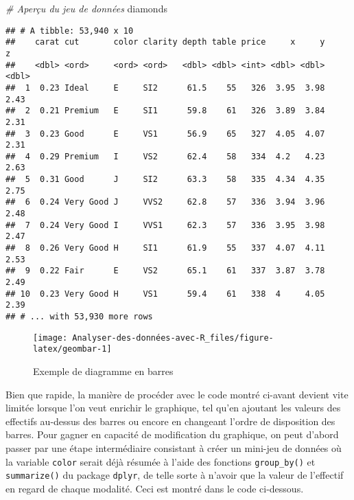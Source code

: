 \documentclass[
  french,
]{book}
\newenvironment{Shaded}{\begin{snugshade}}{\end{snugshade}}
\newcommand{\CommentTok}[1]{\textcolor[rgb]{0.56,0.35,0.01}{\textit{#1}}}
\newcommand{\DataTypeTok}[1]{\textcolor[rgb]{0.13,0.29,0.53}{#1}}
\newcommand{\KeywordTok}[1]{\textcolor[rgb]{0.13,0.29,0.53}{\textbf{#1}}}
\newcommand{\NormalTok}[1]{#1}
\newcommand{\OperatorTok}[1]{\textcolor[rgb]{0.81,0.36,0.00}{\textbf{#1}}}
\newcommand{\StringTok}[1]{\textcolor[rgb]{0.31,0.60,0.02}{#1}}
\begin{document}
\begin{Shaded}
\begin{Highlighting}[]
\CommentTok{# Aperçu du jeu de données}
\NormalTok{diamonds}
\end{Highlighting}
\end{Shaded}

\begin{verbatim}
## # A tibble: 53,940 x 10
##    carat cut       color clarity depth table price     x     y     z
##    <dbl> <ord>     <ord> <ord>   <dbl> <dbl> <int> <dbl> <dbl> <dbl>
##  1  0.23 Ideal     E     SI2      61.5    55   326  3.95  3.98  2.43
##  2  0.21 Premium   E     SI1      59.8    61   326  3.89  3.84  2.31
##  3  0.23 Good      E     VS1      56.9    65   327  4.05  4.07  2.31
##  4  0.29 Premium   I     VS2      62.4    58   334  4.2   4.23  2.63
##  5  0.31 Good      J     SI2      63.3    58   335  4.34  4.35  2.75
##  6  0.24 Very Good J     VVS2     62.8    57   336  3.94  3.96  2.48
##  7  0.24 Very Good I     VVS1     62.3    57   336  3.95  3.98  2.47
##  8  0.26 Very Good H     SI1      61.9    55   337  4.07  4.11  2.53
##  9  0.22 Fair      E     VS2      65.1    61   337  3.87  3.78  2.49
## 10  0.23 Very Good H     VS1      59.4    61   338  4     4.05  2.39
## # ... with 53,930 more rows
\end{verbatim}

\begin{Shaded}
\end{Shaded}

\begin{figure}

{\centering \texttt{[image: Analyser-des-données-avec-R\_files/figure-latex/geombar-1]} 

}

\caption{Exemple de diagramme en barres}\label{fig:geombar}
\end{figure}

Bien que rapide, la manière de procéder avec le code montré ci-avant devient vite limitée lorsque l'on veut enrichir le graphique, tel qu'en ajoutant les valeurs des effectifs au-dessus des barres ou encore en changeant l'ordre de disposition des barres. Pour gagner en capacité de modification du graphique, on peut d'abord passer par une étape intermédiaire consistant à créer un mini-jeu de données où la variable \texttt{color} serait déjà résumée à l'aide des fonctions \texttt{group\_by()} et \texttt{summarize()} du package \texttt{dplyr}, de telle sorte à n'avoir que la valeur de l'effectif en regard de chaque modalité. Ceci est montré dans le code ci-dessous.
\end{document}

